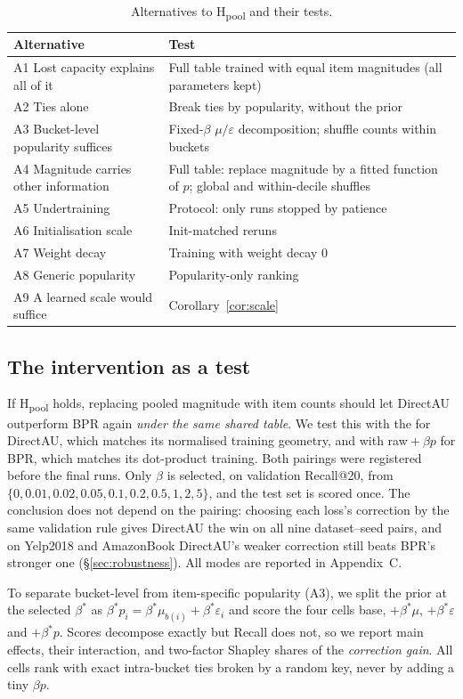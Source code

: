 \begin{table}[t]
\caption{Alternatives to H\textsubscript{pool} and their tests.}\label{tab:alternatives}
\centering\small
\begin{tabular}{@{}p{}p{}@{}}
\toprule
Alternative & Test\\
\midrule
A1 Lost capacity explains all of it & Full table trained with equal item magnitudes (all parameters kept)\\
A2 Ties alone & Break ties by popularity, without the prior\\
A3 Bucket-level popularity suffices & Fixed-$\beta$ $\mu/\varepsilon$ decomposition; shuffle counts within buckets\\
A4 Magnitude carries other information & Full table: replace magnitude by a fitted function of $p$; global and within-decile shuffles\\
A5 Undertraining & Protocol: only runs stopped by patience\\
A6 Initialisation scale & Init-matched reruns\\
A7 Weight decay & Training with weight decay 0\\
A8 Generic popularity & Popularity-only ranking\\
A9 A learned scale would suffice & Corollary~\ref{cor:scale}\\
\bottomrule
\end{tabular}
\end{table}

\subsection{The intervention as a test}\label{sec:intervention}
If H\textsubscript{pool} holds, replacing pooled magnitude with item counts should let DirectAU outperform BPR again \emph{under the same shared table}. We test this with the \crs{} for DirectAU, which matches its normalised training geometry, and with raw${}+\beta p$ for BPR, which matches its dot-product training. Both pairings were registered before the final runs. Only $\beta$ is selected, on validation Recall@20, from $\{0,0.01,0.02,0.05,0.1,0.2,0.5,1,2,5\}$, and the test set is scored once. The conclusion does not depend on the pairing: choosing each loss's correction by the same validation rule gives DirectAU the win on all nine dataset--seed pairs, and on Yelp2018 and AmazonBook DirectAU's weaker correction still beats BPR's stronger one (\S\ref{sec:robustness}). All modes are reported in Appendix~C.

To separate bucket-level from item-specific popularity (A3), we split the prior at the selected $\beta^\ast$ as $\beta^\ast p_i=\beta^\ast\mu_{b(i)}+\beta^\ast\varepsilon_i$ and score the four cells base, $+\beta^\ast\mu$, $+\beta^\ast\varepsilon$ and $+\beta^\ast p$. Scores decompose exactly but Recall does not, so we report main effects, their interaction, and two-factor Shapley shares of the \emph{correction gain}. All cells rank with exact intra-bucket ties broken by a random key, never by adding a tiny $\beta p$.
